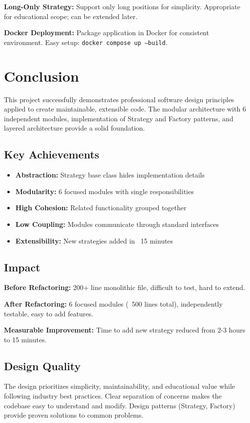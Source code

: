 \documentclass[11pt,a4paper]{article}
\begin{document}
\textbf{Long-Only Strategy:} Support only long positions for simplicity. Appropriate for educational scope; can be extended later.

\textbf{Docker Deployment:} Package application in Docker for consistent environment. Easy setup: \texttt{docker compose up --build}.

\section{Conclusion}

This project successfully demonstrates professional software design principles applied to create maintainable, extensible code. The modular architecture with 6 independent modules, implementation of Strategy and Factory patterns, and layered architecture provide a solid foundation.

\subsection{Key Achievements}
\begin{itemize}[leftmargin=*, itemsep=0pt]
    \item \textbf{Abstraction:} Strategy base class hides implementation details
    \item \textbf{Modularity:} 6 focused modules with single responsibilities
    \item \textbf{High Cohesion:} Related functionality grouped together
    \item \textbf{Low Coupling:} Modules communicate through standard interfaces
    \item \textbf{Extensibility:} New strategies added in ~15 minutes
\end{itemize}

\subsection{Impact}
\textbf{Before Refactoring:} 200+ line monolithic file, difficult to test, hard to extend.

\textbf{After Refactoring:} 6 focused modules (~500 lines total), independently testable, easy to add features.

\textbf{Measurable Improvement:} Time to add new strategy reduced from 2-3 hours to 15 minutes.

\subsection{Design Quality}
The design prioritizes simplicity, maintainability, and educational value while following industry best practices. Clear separation of concerns makes the codebase easy to understand and modify. Design patterns (Strategy, Factory) provide proven solutions to common problems.
\end{document}
